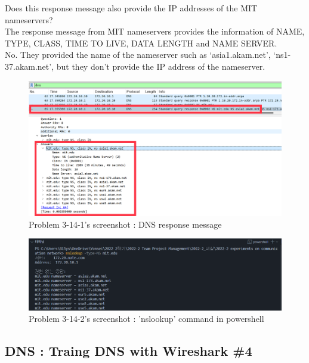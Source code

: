 \begin{enumerate}[label=\bfseries Problem \arabic*:,leftmargin=*,labelindent=1em]
        Does this response message also provide the IP addresses of the MIT nameservers?\\[0.2mm]
            \soln The response message from MIT nameservers provides the information of NAME, TYPE, CLASS, TIME TO LIVE, DATA LENGTH and NAME SERVER.\\ 
            No. They provided the name of the nameserver such as ‘asia1.akam.net’, ‘ns1-37.akam.net’, but they don’t provide the IP address of the nameserver.
            \vspace{-2mm}  
            \begin{figure}[!h]\centering
        		\includegraphics[width=.78\textwidth]{image/result_week01/Q3-e-1.png}
        		\caption{\footnotesize Problem 3-14-1's screenshot : DNS response message}
        		\vspace{-10pt}
            \end{figure}
            \begin{figure}[!h]\centering
        		\includegraphics[width=.79\textwidth]{image/result_week01/Q3-e-2.png}
        		\caption{\footnotesize Problem 3-14-2's screenshot : 'nslookup' command in powershell}
        		\vspace{-10pt}
            \end{figure}
    \end{enumerate}
\subsection{DNS : Traing DNS with Wireshark \#4}
